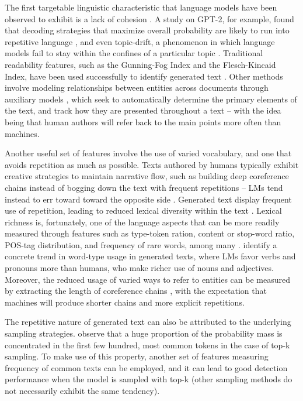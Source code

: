 The first targetable linguistic characteristic that language models have been observed to exhibit is a lack of cohesion \citep{holtzman2019curious}. 
A study on GPT-2, for example, found that decoding strategies that maximize overall probability are likely to run into repetitive language \citep{see2019massively}, and even topic-drift, a phenomenon in which language models fail to stay within the confines of a particular topic \citep{badaskar2008identifying}.
Traditional readability features, such as the Gunning-Fog Index and the Flesch-Kincaid Index, have been used successfully to identify generated text \citep{Crothers_2022}.
Other methods involve modeling relationships between entities across documents through auxiliary models \citep{barzilay2008modeling}, which seek to automatically determine the primary elements of the text, and track how they are presented throughout a text -- with the idea being that human authors will refer back to the main points more often than machines.

Another useful set of features involve the use of varied vocabulary, and one that avoids repetition as much as possible.
Texts authored by humans typically exhibit creative strategies to maintain narrative flow, such as building deep coreference chains instead of bogging down the text with frequent repetitions \citep{feng2010comparison} -- LMs tend instead to err toward toward the opposite side \citep{gehrmann2019gltrstatisticaldetectionvisualization}.
Generated text display frequent use of repetition, leading to reduced lexical diversity within the text \citep{zellers2020evaluating}.
Lexical richness is, fortunately, one of the language aspects that can be more readily measured through features such as type-token ration, content or stop-word ratio, POS-tag distribution, and frequency of rare words, among many \citep{van2007comparing}.
\citet{see2019massively} identify a concrete trend in word-type usage in generated texts, where LMs favor verbs and pronouns more than humans, who make richer use of nouns and adjectives.
Moreover, the reduced usage of varied ways to refer to entities can be measured by extracting the length of coreference chains \citep{feng2010comparison}, with the expectation that machines will produce shorter chains and more explicit repetitions.

The repetitive nature of generated text can also be attributed to the underlying sampling strategies.
\citet{ippolito2019automatic} observe that a huge proportion of the probability mass is concentrated in the first few hundred, most common tokens in the case of top-k sampling.
To make use of this property, another set of features measuring frequency of common texts can be employed, and it can lead to good detection performance when the model is sampled with top-k (other sampling methods do not necessarily exhibit the same tendency).

